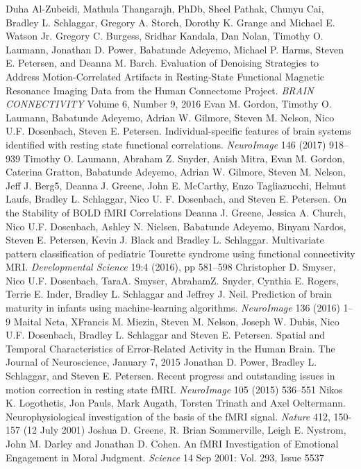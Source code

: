 \documentclass[12pt]{article}
\begin{document}
\begin{thebibliography}{1}
 Duha Al-Zubeidi, Mathula Thangarajh, PhDb, Sheel Pathak, Chunyu Cai, Bradley L. Schlaggar, Gregory A. Storch, Dorothy K. Grange and Michael E. Watson Jr.
 Gregory C. Burgess, Sridhar Kandala, Dan Nolan, Timothy O. Laumann, Jonathan D. Power, Babatunde Adeyemo, Michael P. Harms, Steven E. Petersen, and Deanna M. Barch. Evaluation of Denoising Strategies to Address Motion-Correlated Artifacts in Resting-State Functional Magnetic Resonance Imaging Data from the Human Connectome Project. \textit{BRAIN CONNECTIVITY} Volume 6, Number 9, 2016
 Evan M. Gordon, Timothy O. Laumann, Babatunde Adeyemo, Adrian W. Gilmore, Steven M. Nelson, Nico U.F. Dosenbach, Steven E. Petersen. Individual-specific features of brain systems identified with resting state functional correlations. \textit{NeuroImage} 146 (2017) 918–939
 Timothy O. Laumann, Abraham Z. Snyder, Anish Mitra, Evan M. Gordon, Caterina Gratton, Babatunde Adeyemo, Adrian W. Gilmore, Steven M. Nelson, Jeff J. Berg5, Deanna J. Greene, John E. McCarthy, Enzo Tagliazucchi, Helmut Laufs, Bradley L. Schlaggar, Nico U. F. Dosenbach, and Steven E. Petersen. On the Stability of BOLD fMRI Correlations
 Deanna J. Greene, Jessica A. Church, Nico U.F. Dosenbach, Ashley N. Nielsen, Babatunde Adeyemo, Binyam Nardos, Steven E. Petersen, Kevin J. Black and Bradley L. Schlaggar. Multivariate pattern classification of pediatric Tourette syndrome using functional connectivity MRI. \textit{Developmental Science} 19:4 (2016), pp 581–598
 Christopher D. Smyser, Nico U.F. Dosenbach, TaraA. Smyser, AbrahamZ. Snyder, Cynthia E. Rogers, Terrie E. Inder, Bradley L. Schlaggar and Jeffrey J. Neil. Prediction of brain maturity in infants using machine-learning algorithms. \textit{NeuroImage} 136 (2016) 1–9
 Maital Neta, XFrancis M. Miezin, Steven M. Nelson, Joseph W. Dubis, Nico U.F. Dosenbach, Bradley L. Schlaggar and Steven E. Petersen. Spatial and Temporal Characteristics of Error-Related Activity in the Human Brain. The Journal of Neuroscience, January 7, 2015
 Jonathan D. Power, Bradley L. Schlaggar, and Steven E. Petersen. Recent progress and outstanding issues in motion correction in resting state fMRI. \textit{NeuroImage} 105 (2015) 536–551
 Nikos K. Logothetis, Jon Pauls, Mark Augath, Torsten Trinath and Axel Oeltermann. Neurophysiological investigation of the basis of the fMRI signal. \textit{Nature} 412, 150-157 (12 July 2001)
Joshua D. Greene, R. Brian Sommerville, Leigh E. Nystrom, John M. Darley and Jonathan D. Cohen. An fMRI Investigation of Emotional Engagement in Moral Judgment. \textit{Science}  14 Sep 2001: Vol. 293, Issue 5537

\end{thebibliography}
\end{document}
